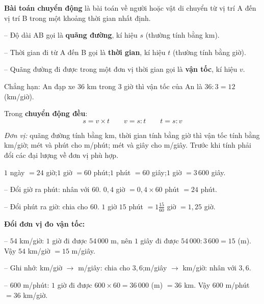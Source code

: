 \begin{knowbox}
\begin{minipage}[t]{0.6\linewidth}
\textbf{Bài toán chuyển động} là bài toán về người hoặc vật di chuyển từ vị trí A đến vị trí B trong một khoảng thời gian nhất định.\par
\smallskip
-- Độ dài AB gọi là \textbf{quãng đường}, kí hiệu $s$ (thường tính bằng km).\par
-- Thời gian đi từ A đến B gọi là \textbf{thời gian}, kí hiệu $t$ (thường tính bằng giờ).\par
-- Quãng đường đi được trong một đơn vị thời gian gọi là \textbf{vận tốc}, kí hiệu $v$.\par
\smallskip
Chẳng hạn: An đạp xe $36$ km trong $3$ giờ thì vận tốc của An là $36:3=12$ (km/giờ).\par
\smallskip
Trong \textbf{chuyển động đều}:
\[s=v\times t\qquad v=s:t\qquad t=s:v\]
\end{minipage}\hfill
\begin{minipage}[t]{0.36\linewidth}\vspace{18pt}\centering
{}
\end{minipage}\par
\smallskip
\emph{Đơn vị:} quãng đường tính bằng km, thời gian tính bằng giờ thì vận tốc tính bằng km/giờ; mét và phút cho m/phút; mét và giây cho m/giây. Trước khi tính phải đổi các đại lượng về đơn vị phù hợp.
\end{knowbox}

\begin{knowbox}
$1$ ngày $=24$ giờ;\quad $1$ giờ $=60$ phút;\quad $1$ phút $=60$ giây;\quad $1$ giờ $=3\,600$ giây.\par
\smallskip
-- Đổi giờ ra phút: nhân với $60$. \quad $0{,}4$ giờ $=0{,}4\times60$ phút $=24$ phút.\par
-- Đổi phút ra giờ: chia cho $60$. \quad $1$ giờ $15$ phút $=1\frac{15}{60}$ giờ $=1{,}25$ giờ.\par
\smallskip
\textbf{Đổi đơn vị đo vận tốc:}\par
-- $54$ km/giờ: $1$ giờ đi được $54\,000$ m, nên $1$ giây đi được $54\,000:3\,600=15$ (m). Vậy $54$ km/giờ $=15$ m/giây.\par
-- Ghi nhớ: km/giờ $\to$ m/giây: chia cho $3{,}6$;\quad m/giây $\to$ km/giờ: nhân với $3{,}6$.\par
-- $600$ m/phút: $1$ giờ đi được $600\times60=36\,000$ (m) $=36$ km. Vậy $600$ m/phút $=36$ km/giờ.
\end{knowbox}

